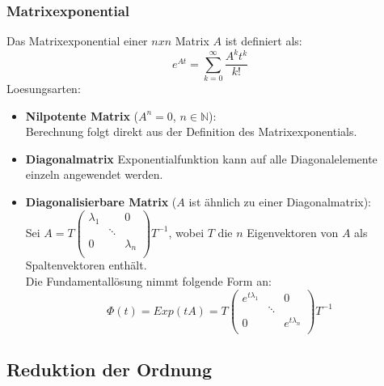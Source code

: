\documentclass[a4paper, fontsize = 8pt, landscape]{scrartcl}
\begin{document}
\begin{multicols*}{3}
    \subsubsection*{Matrixexponential}
    Das Matrixexponential einer $nxn$ Matrix $A$ ist definiert als:
    \begin{equation*}
        e^{At}=\sum_{k=0}^{\infty}\frac{A^kt^k}{k!}
    \end{equation*}
    Loesungsarten:
    \begin{itemize}
        \item \textbf{Nilpotente Matrix} ($A^n=0$, $n\in \mathbb{N}$): \\
              Berechnung folgt direkt aus der Definition des Matrixexponentials.
        \item \textbf{Diagonalmatrix}
              Exponentialfunktion kann auf alle Diagonalelemente einzeln angewendet werden.
        \item \textbf{Diagonalisierbare Matrix} ($A$ ist ähnlich zu einer Diagonalmatrix): \\
              Sei $A = T \begin{pmatrix}
                      \lambda_1 &        & 0         \\
                                & \ddots &           \\
                      0         &        & \lambda_n \\
                  \end{pmatrix} T^{-1}$, wobei $T$ die $n$ Eigenvektoren von $A$ als Spaltenvektoren enthält. \\
              Die Fundamentallösung nimmt folgende Form an:
              \begin{equation*}
                  \Phi(t) = Exp(t A) = T \begin{pmatrix}
                      e^{t \lambda_1} &        & 0               \\
                                      & \ddots &                 \\
                      0               &        & e^{t \lambda_n} \\
                  \end{pmatrix} T^{-1}
              \end{equation*}
    \end{itemize}

    \subsection{Reduktion der Ordnung}


\end{multicols*}
\end{document}
